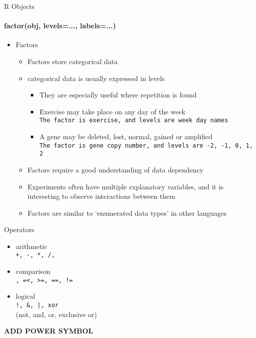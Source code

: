 \documentclass{beamer}
\begin{document}
\begin{frame}{R Objects}
    \framesubtitle{factor(obj, levels=..., labels=...)}
    \begin{itemize}
        \item Factors
        \begin{itemize}
            \item Factors store categorical data
            \item categorical data is usually expressed in levels
            \begin{itemize}
                \item They are especially useful where repetition is found
                \item Exercise may take place on any day of the week \\
                {\tt The factor is exercise, and levels are week day names}
                \item A gene may be deleted, lost, normal, gained or amplified \\
                {\tt The factor is gene copy number, and levels are -2, -1, 0, 1, 2}
            \end{itemize}
            \item Factors require a good understanding of data dependency
            \item Experiments often have multiple explanatory variables, and it is interesting to observe interactions between them
            \item Factors are similar to `enumerated data types' in other languages
        \end{itemize}
    \end{itemize}
\end{frame}

\begin{frame}{Operators}
    \begin{itemize}
        \item arithmetic \\
        {\tt +, -, *, /, } 
        \item comparison \\
        {\tt <, >, =<, >=, ==, !=}
        \item logical \\
        {\tt !, \&, |, xor} \\
        (not, and, or, exclusive or)
    \end{itemize}
    \textbf{ADD POWER SYMBOL}
\end{frame}
\end{document}
